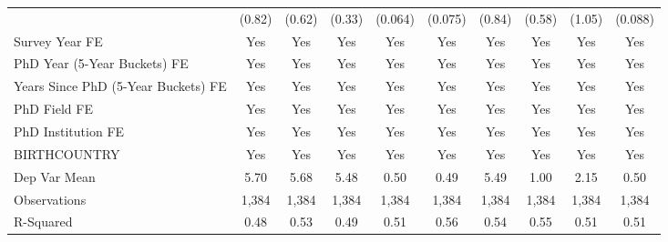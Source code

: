 \begin{table}[htbp]
\begin{tabular}{l*{9}{c}}
  &      (0.82)         &      (0.62)         &      (0.33)         &     (0.064)         &     (0.075)         &      (0.84)         &      (0.58)         &      (1.05)         &     (0.088)         \\
[1em]
Survey Year FE&         Yes         &         Yes         &         Yes         &         Yes         &         Yes         &         Yes         &         Yes         &         Yes         &         Yes         \\
[1em]
PhD Year (5-Year Buckets) FE&         Yes         &         Yes         &         Yes         &         Yes         &         Yes         &         Yes         &         Yes         &         Yes         &         Yes         \\
[1em]
Years Since PhD (5-Year Buckets) FE&         Yes         &         Yes         &         Yes         &         Yes         &         Yes         &         Yes         &         Yes         &         Yes         &         Yes         \\
[1em]
PhD Field FE&         Yes         &         Yes         &         Yes         &         Yes         &         Yes         &         Yes         &         Yes         &         Yes         &         Yes         \\
[1em]
PhD Institution FE&         Yes         &         Yes         &         Yes         &         Yes         &         Yes         &         Yes         &         Yes         &         Yes         &         Yes         \\
[1em]
BIRTHCOUNTRY&         Yes         &         Yes         &         Yes         &         Yes         &         Yes         &         Yes         &         Yes         &         Yes         &         Yes         \\
\hline
Dep Var Mean&        5.70         &        5.68         &        5.48         &        0.50         &        0.49         &        5.49         &        1.00         &        2.15         &        0.50         \\
Observations&       1,384         &       1,384         &       1,384         &       1,384         &       1,384         &       1,384         &       1,384         &       1,384         &       1,384         \\
R-Squared&        0.48         &        0.53         &        0.49         &        0.51         &        0.56         &        0.54         &        0.55         &        0.51         &        0.51         \\

\end{tabular}
\end{table}
